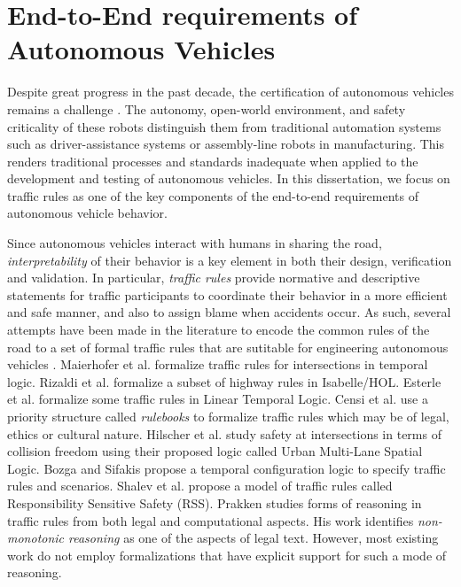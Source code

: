 \section{End-to-End requirements of Autonomous Vehicles}

Despite great progress in the past decade, the certification of autonomous vehicles remains a challenge \cite{Zhao.2022}.
%
The autonomy, open-world environment, and safety criticality of these robots distinguish them from traditional automation systems such as driver-assistance systems or assembly-line robots in manufacturing.
%
This renders traditional processes and standards inadequate when applied to the development and testing of autonomous vehicles.
%
In this dissertation, we focus on traffic rules as one of the key components of the end-to-end requirements of autonomous vehicle behavior.


Since autonomous vehicles interact with humans in sharing the road, \emph{interpretability} of their behavior is a key element in both their design, verification and validation.
%
In particular, \emph{traffic rules} provide normative and descriptive statements for traffic participants to coordinate their behavior in a more efficient and safe manner, and also to assign blame when accidents occur.
%
As such, several attempts have been made in the literature to encode the common rules of the road to a set of formal traffic rules that are sutitable for engineering autonomous vehicles \cite{Bin.2022,arechiga2019specifying,Corso.2020,Esterle.2020,Maierhofer.2020,Hekmatnejad.2019,Cho.2019,Sahin.2020,Censi.2019}.
%
Maierhofer et al. \cite{Maierhofer.2022} formalize traffic rules for intersections in temporal logic.
%
Rizaldi et al. \cite{Rizaldi.2015,Rizaldi.2017} formalize a subset of highway rules in Isabelle/HOL.
%
Esterle et al. \cite{Esterle.2019,Esterle.2020} formalize some traffic rules in Linear Temporal Logic.
%
Censi et al. \cite{Censi.2019} use a priority structure called \emph{rulebooks} to formalize traffic rules which may be of legal, ethics or cultural nature.
%
Hilscher et al. \cite{Hilscher.2016} study safety at intersections in terms of collision freedom using their proposed logic called Urban Multi-Lane Spatial Logic.
%
Bozga and Sifakis \cite{Bozga.2021} propose a temporal configuration logic to specify traffic rules and scenarios.
%
Shalev et al. \cite{Shalev.2017} propose a model of traffic rules called Responsibility Sensitive Safety (RSS).
%
Prakken \cite{Prakken.2017} studies forms of reasoning in traffic rules from both legal and computational aspects.
%
His work identifies \emph{non-monotonic reasoning} as one of the aspects of legal text.
%
However, most existing work do not employ formalizations that have explicit support for such a mode of reasoning.

